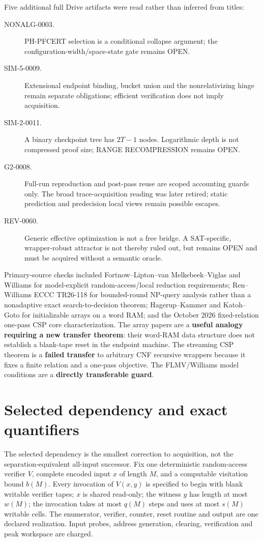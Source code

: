 \documentclass[11pt]{article}
\begin{document}
Five additional full Drive artifacts were read rather than inferred from
titles:
\begin{description}
\item[NONALG-0003.] PH-PFCERT selection is a conditional collapse argument;
the configuration-width/space-state gate remains OPEN.
\item[SIM-5-0009.] Extensional endpoint binding, bucket union and the
nonrelativizing hinge remain separate obligations; efficient verification does
not imply acquisition.
\item[SIM-2-0011.] A binary checkpoint tree has $2T-1$ nodes.  Logarithmic
depth is not compressed proof size; RANGE RECOMPRESSION remains OPEN.
\item[G2-0008.] Full-run reproduction and post-pass reuse are scoped accounting
guards only.  The broad trace-acquisition reading was later retired; static
prediction and predecision local views remain possible escapes.
\item[REV-0060.] Generic effective optimization is not a free bridge.  A
SAT-specific, wrapper-robust attractor is not thereby ruled out, but remains
OPEN and must be acquired without a semantic oracle.
\end{description}

Primary-source checks included Fortnow--Lipton--van Melkebeek--Viglas and
Williams for model-explicit random-access/local reduction requirements;
Ren--Williams ECCC TR26-118 for bounded-round NP-query analysis rather than a
nonadaptive exact search-to-decision theorem; Hagerup--Kammer and
Katoh--Goto for initializable arrays on a word RAM; and the October 2026
fixed-relation one-pass CSP core characterization.  The array papers are a
\textbf{useful analogy requiring a new transfer theorem}: their word-RAM data
structure does not establish a blank-tape reset in the endpoint machine.  The
streaming CSP theorem is a \textbf{failed transfer} to arbitrary CNF recursive
wrappers because it fixes a finite relation and a one-pass objective.  The
FLMV/Williams model conditions are a \textbf{directly transferable guard}.

\section*{Selected dependency and exact quantifiers}
The selected dependency is the smallest correction to acquisition, not the
separation-equivalent all-input successor.  Fix one deterministic
random-access verifier $V$, complete encoded input $x$ of length $M$, and a
computable visitation bound $b(M)$.  Every invocation of $V(x,y)$ is specified
to begin with blank writable verifier tapes; $x$ is shared read-only; the
witness $y$ has length at most $w(M)$; the invocation takes at most $q(M)$
steps and uses at most $s(M)$ writable cells.  The enumerator, verifier,
counter, reset routine and output are one declared realization.  Input probes,
address generation, clearing, verification and peak workspace are charged.
\end{document}
